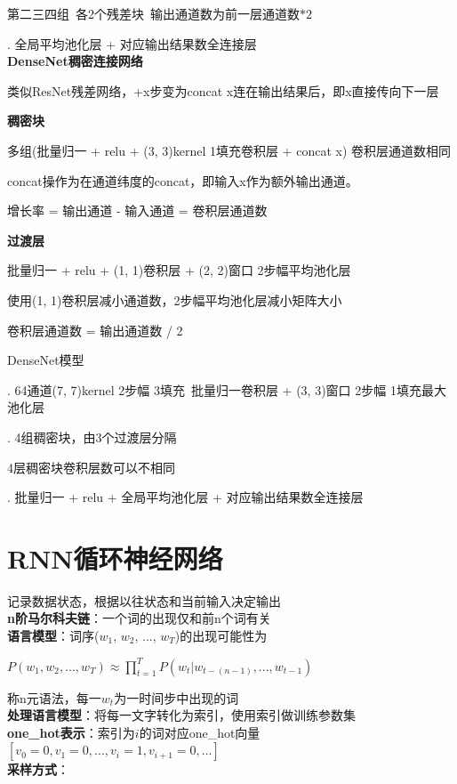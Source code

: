 \documentclass[UTF8]{ctexart}
\begin{document}
  \quad \quad 第二三四组\ 各2个残差块\ 输出通道数为前一层通道数$*2$

  . 全局平均池化层 + 对应输出结果数全连接层\\
\textbf{DenseNet稠密连接网络}

  类似ResNet残差网络，+x步变为concat x连在输出结果后，即x直接传向下一层

  \textbf{稠密块}

  \quad 多组(批量归一 + relu + (3, 3)kernel 1填充卷积层 + concat x) 卷积层通道数相同

  \quad concat操作为在通道纬度的concat，即输入x作为额外输出通道。

  \quad 增长率 = 输出通道 - 输入通道 = 卷积层通道数

  \textbf{过渡层}

  \quad 批量归一 + relu + (1, 1)卷积层 + (2, 2)窗口 2步幅平均池化层
  
  \quad 使用(1, 1)卷积层减小通道数，2步幅平均池化层减小矩阵大小

  \quad \quad 卷积层通道数 = 输出通道数 / 2

  DenseNet模型

  . 64通道(7, 7)kernel 2步幅 3填充\ 批量归一卷积层 + (3, 3)窗口 2步幅 1填充最大池化层

  . 4组稠密块，由3个过渡层分隔

  \quad \quad 4层稠密块卷积层数可以不相同

  . 批量归一 + relu + 全局平均池化层 + 对应输出结果数全连接层

\section{RNN循环神经网络}

\noindent 记录数据状态，根据以往状态和当前输入决定输出\\
\textbf{n阶马尔科夫链}：一个词的出现仅和前n个词有关\\
\textbf{语言模型}：词序($w_1$, $w_2$, ..., $w_T$)的出现可能性为

  $P(w_1, w_2,...,w_T)\approx \prod_{t=1}^{T} P(w_t|w_{t-(n-1)},...,w_{t-1})$

  称n元语法，每一$w_t$为一时间步中出现的词\\
\textbf{处理语言模型}：将每一文字转化为索引，使用索引做训练参数集\\
\textbf{one\_hot表示}：索引为$i$的词对应one\_hot向量$[v_0 = 0, v_1 = 0, ..., v_i = 1, v_{i+1} = 0, ...]$\\
\textbf{采样方式}：
\end{document}
